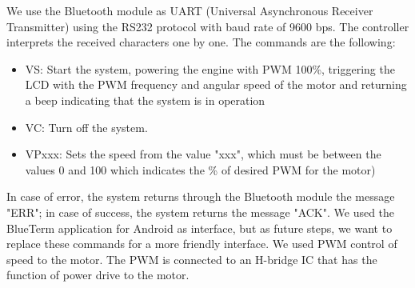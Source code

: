 \documentclass[journal]{IEEEtran}
\begin{document}

We use the Bluetooth module as UART (Universal Asynchronous Receiver Transmitter) using the RS232 protocol with baud rate of 9600 bps. The controller interprets the received characters one by one. The commands are the following:


\begin{itemize}
\item VS: Start the system, powering the engine with PWM 100\%, triggering the LCD with the PWM frequency and angular speed of the motor and returning a beep indicating that the system is in operation
\item VC: Turn off the system.
\item VPxxx: Sets the speed from the value "xxx", which must be between the values 0 and 100 which indicates the \% of desired PWM for the motor)
\end{itemize}






In case of error, the system returns through the Bluetooth module the message "ERR"; in case of success, the system returns the message "ACK". We used the BlueTerm application for Android as interface, but as future steps, we want to replace these commands for a more friendly interface.
We used PWM control of speed to the motor. The PWM is connected to an H-bridge IC that has the function of power drive to the motor.
\end{document}
